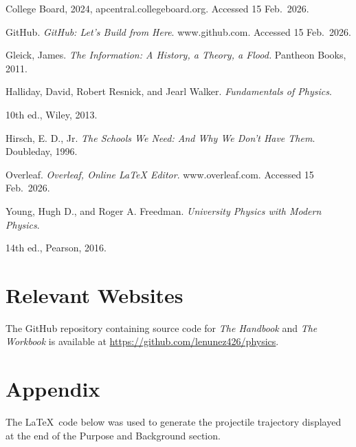 \documentclass[12pt]{article}
\begin{document}
College Board, 2024, apcentral.collegeboard.org. Accessed 15 Feb.\ 2026.


\noindent GitHub. \textit{GitHub: Let’s Build from Here}. www.github.com. Accessed 15 Feb.\ 2026.


\noindent Gleick, James. \textit{The Information: A History, a Theory, a Flood.} Pantheon Books, 2011.

\noindent Halliday, David, Robert Resnick, and Jearl Walker. \textit{Fundamentals of Physics}. 

10th ed., Wiley, 2013.


\noindent Hirsch, E. D., Jr. \textit{The Schools We Need: And Why We Don’t Have Them}. Doubleday, 1996.

\noindent Overleaf. \textit{Overleaf, Online LaTeX Editor}. www.overleaf.com. Accessed 15 Feb.\ 2026.

\noindent Young, Hugh D., and Roger A. Freedman. \textit{University Physics with Modern Physics}. 

14th ed., Pearson, 2016.




\section{Relevant Websites}

The GitHub repository containing source code for \textit{The Handbook} and \textit{The Workbook} is available at \href{https://github.com/lenunez426/physics}{https://github.com/lenunez426/physics}.

\clearpage

\section{Appendix}
The \LaTeX\ code below was used to generate the projectile trajectory displayed at the end of the Purpose and Background section.
\end{document}
